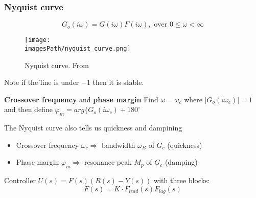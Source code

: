 \subsubsection{Nyquist curve}
\begin{equation*}
    G_o(i\omega) = G(i\omega)F(i\omega), \text{ over } 0 \leq \omega < \infty
\end{equation*}


\begin{figure}[!h]
    \centering
    \texttt{[image: \\imagesPath/nyquist\_curve.png]}
    \caption{Nyquist curve. From \cite{}}
    \label{fig:nyquist_curve}
\end{figure}
Note if the \" line is under $-1$ \" then it is stable.
\begin{definitionblock}{\textbf{Crossover frequency} and \textbf{phase margin}}
   Find $\omega = \omega_c$ where $|G_o(i\omega_c)| = 1$ and then define \newline
   $\varphi_m = arg\{ G_o(i\omega_c) + 180^{\circ}$
\end{definitionblock}

The Nyquist curve also tells us quickness and dampining
\begin{itemize}
    \item Crossover frequency $\omega_c \Rightarrow$ bandwidth $\omega_B$ of $G_c$ (quickness)
    \item Phase margin $\varphi_m \Rightarrow$ resonance peak $M_p$ of $G_c$ (damping)
\end{itemize}

Controller $U(s) = F(s)(R(s)-Y(s))$ with three blocks:
\begin{equation*}
    F(s) = K\cdot F_{lead}(s) F_{lag}(s)
\end{equation*}


